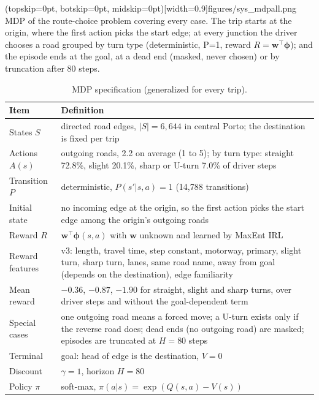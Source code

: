 \documentclass{ieeeaccess}
\newcommand{\bphi}{\boldsymbol{\phi}}
\newcommand{\bw}{\mathbf{w}}
\begin{document}
\Figure[t!](topskip=0pt, botskip=0pt, midskip=0pt)[width=0.9\textwidth]{figures/sys_mdpall.png}
{MDP of the route-choice problem covering every case. The trip starts at the origin, where the first action picks the start edge; at every junction the driver chooses a road grouped by turn type (deterministic, P=1, reward $R=\bw^\top\bphi$); and the episode ends at the goal, at a dead end (masked, never chosen) or by truncation after 80 steps.\label{fig:mdp}}

\begin{table}[t]
\centering\footnotesize
\caption{MDP specification (generalized for every trip).}\label{tab:mdpspec}
\begin{tabular}{@{}>{\raggedright\arraybackslash}p{1.5cm}>{\raggedright\arraybackslash}p{5.9cm}@{}}
\toprule
Item & Definition\\
\midrule
States $S$ & directed road edges, $|S|=6{,}644$ in central Porto; the destination is fixed per trip\\
Actions $A(s)$ & outgoing roads, 2.2 on average (1 to 5); by turn type: straight 72.8\%, slight 20.1\%, sharp or U-turn 7.0\% of driver steps\\
Transition $P$ & deterministic, $P(s'|s,a)=1$ (14{,}788 transitions)\\
Initial state & no incoming edge at the origin, so the first action picks the start edge among the origin's outgoing roads\\
Reward $R$ & $\bw^\top\bphi(s,a)$ with $\bw$ unknown and learned by MaxEnt IRL\\
Reward features & v3: length, travel time, step constant, motorway, primary, slight turn, sharp turn, lanes, same road name, away from goal (depends on the destination), edge familiarity\\
Mean reward & $-0.36$, $-0.87$, $-1.90$ for straight, slight and sharp turns, over driver steps and without the goal-dependent term\\
Special cases & one outgoing road means a forced move; a U-turn exists only if the reverse road does; dead ends (no outgoing road) are masked; episodes are truncated at $H=80$ steps\\
Terminal & goal: head of edge is the destination, $V=0$\\
Discount & $\gamma=1$, horizon $H=80$\\
Policy $\pi$ & soft-max, $\pi(a|s)=\exp(Q(s,a)-V(s))$\\
\bottomrule
\end{tabular}
\end{table}
\end{document}
